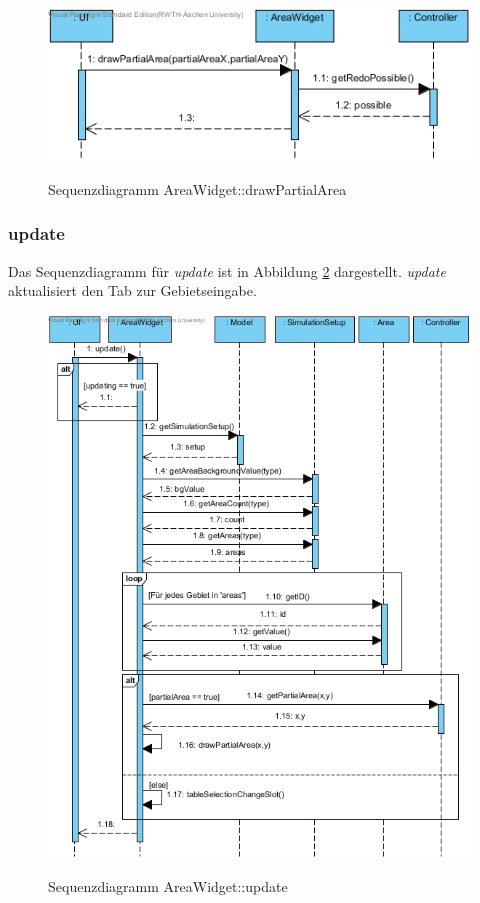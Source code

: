\begin{figure}[H]
	\centering
	\includegraphics[scale=.85]{Bilder/AreaWidget__drawPartialArea().jpg}\\
	\caption{Sequenzdiagramm AreaWidget::drawPartialArea}
	\label{Sequenzdiagramm AreaWidget::drawPartialArea}
\end{figure}

\subsubsection*{update}

Das Sequenzdiagramm für \emph{update} ist in Abbildung \ref{Sequenzdiagramm AreaWidget::update} dargestellt. \emph{update} aktualisiert den Tab zur Gebietseingabe.

\begin{figure}[H]
	\centering
	\includegraphics[scale=.85]{Bilder/AreaWidget__update().jpg}\\
	\caption{Sequenzdiagramm AreaWidget::update}
	\label{Sequenzdiagramm AreaWidget::update}
\end{figure}

